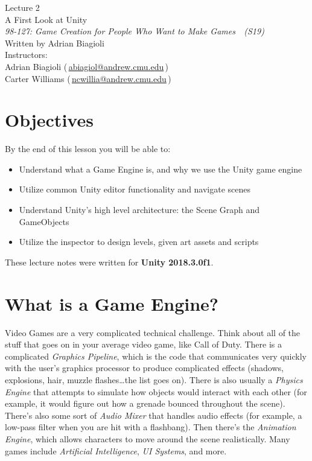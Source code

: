 \documentclass[11pt]{article}
\makeatletter
\newcommand{\lecturenum}{2}
\newcommand{\lecturename}{A First Look at Unity}
\newcommand{\authorname}{Adrian Biagioli}
\newcommand{\coursenum}{98-127}
\newcommand{\coursename}{Game Creation for People Who Want to Make Games}
\newcommand{\coursesem}{S19}
\newcommand{\instructors}{Adrian Biagioli (\,\href{mailto:abiagiol@andrew.cmu.edu}{abiagiol@andrew.cmu.edu}\,) \\ Carter Williams (\,\href{mailto:ncwillia@andrew.cmu.edu}{ncwillia@andrew.cmu.edu}\,)}
\makeatother
\begin{document}
\thispagestyle{plain}
{
    \vspace{1.5em}
    \begin{center}
    {
        \huge
        Lecture \lecturenum \\
        \vspace{0.5em}
        \lecturename
        \vspace{0.4em}
    } \\
    {
        \it
        \coursenum: \coursename\ \ (\coursesem)
    } \\
    \vspace{1.0em}
    Written by \authorname \\
    \vspace{0.7em}
    Instructors:\\ \instructors
    \end{center}
}

\section{Objectives}

By the end of this lesson you will be able to:
\begin{itemize}
    \item Understand what a Game Engine is, and why we use the Unity game engine
    \item Utilize common Unity editor functionality and navigate scenes
    \item Understand Unity's high level architecture: the Scene Graph and GameObjects
    \item Utilize the inspector to design levels, given art assets and scripts
\end{itemize}

\noindent These lecture notes were written for {\bf Unity 2018.3.0f1}.

\section{What is a Game Engine?}

\par Video Games are a very complicated technical challenge.  Think about all of the stuff that goes on in your average video game, like Call of Duty.  There is a complicated {\it Graphics Pipeline}, which is the code that communicates very quickly with the user's graphics processor to produce complicated effects (shadows, explosions, hair, muzzle flashes\dots the list goes on).  There is also usually a {\it Physics Engine} that attempts to simulate how objects would interact with each other (for example, it would figure out how a grenade bounced throughout the scene).  There's also some sort of {\it Audio Mixer} that handles audio effects (for example, a low-pass filter when you are hit with a flashbang).  Then there's the {\it Animation Engine}, which allows characters to move around the scene realistically.  Many games include {\it Artificial Intelligence}, {\it UI Systems}, and more.
\end{document}
